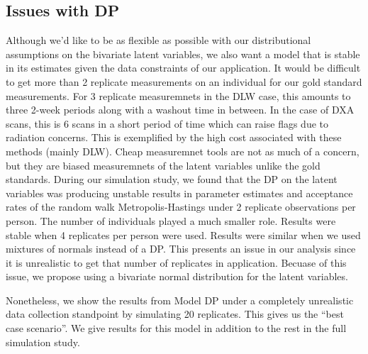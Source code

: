 \documentclass[11pt]{article}\usepackage[]{graphicx}\usepackage[]{color}
\begin{document}
\subsection{Issues with DP}

Although we'd like to be as flexible as possible with our distributional assumptions on the bivariate latent variables, we also want a model that is stable in its estimates given the data constraints of our application. It would be difficult to get more than 2 replicate measurements on an individual for our gold standard measurements. For 3 replicate measuremnets in the DLW case, this amounts to three 2-week periods along with a washout time in between. In the case of DXA scans, this is 6 scans in a short period of time which can raise flags due to radiation concerns. This is exemplified by the high cost associated with these methods (mainly DLW). Cheap measuremnet tools are not as much of a concern, but they are biased measuremnets of the latent variables unlike the gold standards. During our simulation study, we found that the DP on the latent variables was producing unstable results in parameter estimates and acceptance rates of the random walk Metropolis-Hastings under 2 replicate observations per person. The number of individuals played a much smaller role. Results were stable when 4 replicates per person were used. Results were similar when we used mixtures of normals instead of a DP. This presents an issue in our analysis since it is unrealistic to get that number of replicates in application. Becuase of this issue, we propose using a bivariate normal distribution for the latent variables. 

Nonetheless, we show the results from Model DP under a completely unrealistic data collection standpoint by simulating 20 replicates. This gives us the ``best case scenario''. We give results for this model in addition to the rest in the full simulation study. 
\end{document}
